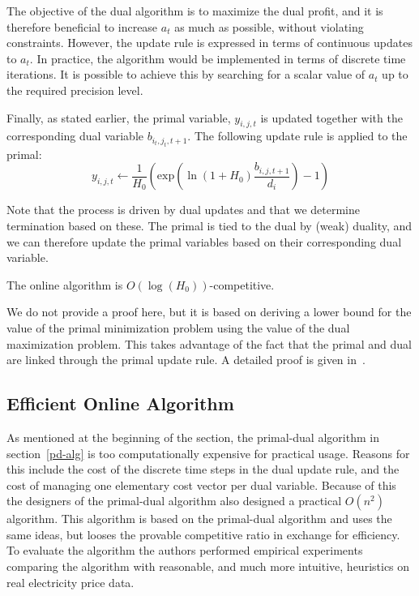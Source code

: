 The objective of the dual algorithm is to maximize the dual profit, and it is therefore beneficial to increase $a_t$ as much as possible, without violating constraints.
However, the update rule is expressed in terms of continuous updates to $a_t$.
In practice, the algorithm would be implemented in terms of discrete time iterations.
It is possible to achieve this by searching for a scalar value of $a_t$ up to the required precision level.

Finally, as stated earlier, the primal variable, $y_{i,j,t}$ is updated together with the corresponding dual variable $b_{i_t,j_t,t+1}$.
The following update rule is applied to the primal:
\[
 y_{i,j,t} \leftarrow \frac{1}{H_0}\left(\textrm{exp}\left(\ln(1+H_0) \frac{b_{i,j,t+1}}{d_i}\right)-1\right)
\]

Note that the process is driven by dual updates and that we determine termination based on these.
The primal is tied to the dual by (weak) duality, and we can therefore update the primal variables based on their corresponding dual variable.

\begin{theorem}
 The online algorithm is $O(\log(H_0))$-competitive.
\end{theorem}

We do not provide a proof here, but it is based on deriving a lower bound for the value of the primal minimization problem using the value of the dual maximization problem. This takes advantage of the fact that the primal and dual are linked through the primal update rule.
A detailed proof is given in~\cite{buchbinder11:job-migration}.

\subsection{Efficient Online Algorithm}

As mentioned at the beginning of the section, the primal-dual algorithm in section~\ref{pd-alg} is too computationally expensive for practical usage.
Reasons for this include the cost of the discrete time steps in the dual update rule, and the cost of managing one \mbox{elementary} cost vector per dual variable.
Because of this the designers of the primal-dual algorithm also designed a practical $O(n^2)$ algorithm.
This algorithm is based on the primal-dual algorithm and uses the same ideas, but looses the provable competitive ratio in exchange for efficiency.
To evaluate the algorithm the authors performed empirical experiments comparing the algorithm with reasonable, and much more intuitive, heuristics on real electricity price data.

